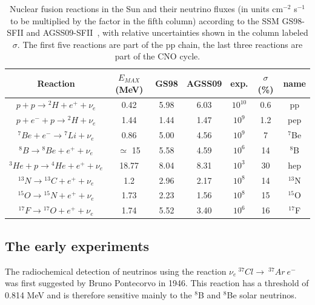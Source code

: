\begin{table}
\caption{Nuclear fusion reactions in the Sun and their neutrino fluxes (in units cm$^{-2}$ s$^{-1}$ to be multiplied by the factor in the fifth column) according to the SSM GS98-SFII and AGSS09-SFII~\cite{serenelli}, with relative uncertainties shown in the column labeled $\sigma$. The first five reactions are part of the pp chain, the last three reactions are part of the CNO cycle.}
\centering
\begin{tabular}{|c|c|c|c|c|c|c|}
  \hline
  Reaction & $E_{MAX}$ (MeV) & GS98 & AGSS09& exp. & $\sigma$ (\%) &name \\ 
  \hline
$ p + p \rightarrow {^2}H + e ^+ + \nu_e$ & 0.42 & 5.98  & 6.03   & $10^{10}$ & 0.6 &pp \\
$ p + e^- + p \rightarrow {^2}H  + \nu_e$ & 1.44 & 1.44  &1.47& $10^{9}$  & 1.2 &pep \\
$ {^7}Be + e^- \rightarrow {^7}Li + \nu_e$ & 0.86 & 5.00 & 4.56& $10^{9}$  & 7 &$ {^7}$Be \\
$ {^8}B \rightarrow {^8}Be + e ^+ + \nu_e$ & $\simeq$ 15 & 5.58  &4.59  &  $10^{6}$  & 14 &$ {^8}$B\\
$  {^3}He + p \rightarrow {^4}He + e ^+ + \nu_e$ & 18.77 & 8.04  &8.31 &$10^{3}$  & 30 &hep \\
$ {^{13}}N \rightarrow {^{13}}C + e ^+ + \nu_e$ & 1.2 & 2.96 &2.17    &$10^{8}$  &14  &$ {^{13}}$N\\
$ {^{15}}O \rightarrow {^{15}}N + e ^+ + \nu_e$ & 1.73 & 2.23 &1.56    &$10^{8}$  & 15& $ {^{15}}$O\\
$ {^{17}}F \rightarrow {^{17}}O + e ^+ + \nu_e$ & 1.74 & 5.52  &3.40   &$10^{6}$  & 16 &$ {^{17}}$F\\
  \hline
\end{tabular}
\label{tab:snuflux}
\end{table}


\subsection{The early experiments}

The radiochemical detection of neutrinos using the reaction 
$\nu_e~^{37}Cl\rightarrow~^{37}Ar~e^-$ was first suggested by Bruno Pontecorvo in 1946\cite{pontecorvo46}. This reaction has a threshold of 0.814 MeV and is therefore sensitive mainly to the $^8$B and $^8$Be solar neutrinos.

